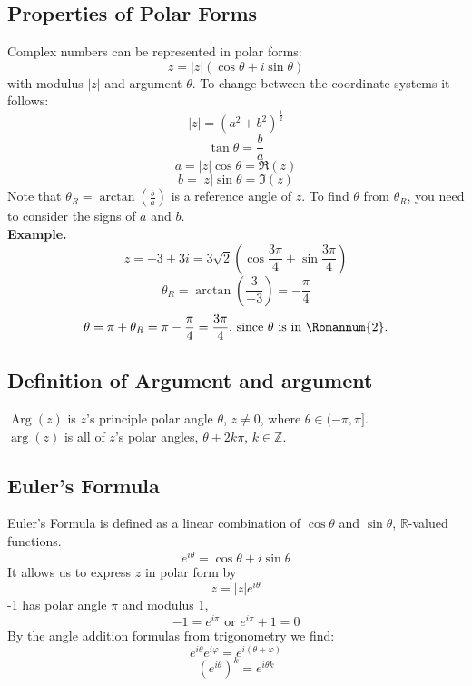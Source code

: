 \documentclass[11pt]{article}
\begin{document}
\subsection{Properties of Polar Forms} 
Complex numbers can be represented in polar forms: 
$$z = |z|(\cos\theta + i\sin\theta)$$
with modulus $|z|$ and argument $\theta$. To change between the coordinate systems it follows: 
$$|z| = (a^2 + b^2)^{\frac{1}{2}}$$
$$\tan\theta = \frac{b}{a}$$
$$a = |z|\cos\theta= \Re(z)$$
$$b = |z|\sin\theta = \Im(z)$$
Note that $\theta_R = \arctan(\frac{b}{a})$ is a reference angle of $z$. To find $\theta$ from $\theta_R$, you need to consider the signs of $a$ and $b$. \\
\newline
\textbf{Example.} \\
$$z = -3 + 3i = 3\sqrt2(\cos\frac{3\pi}{4} + \sin\frac{3\pi}{4})$$
$$\theta_R = \arctan(\frac{3}{-3})= -\frac{\pi}{4}$$
\begin{equation*}
\theta = \pi + \theta_R = \pi -\frac{\pi}{4} = \frac{3\pi}{4} \mbox{, since } \theta \mbox{ is in } \Romannum{2} .
\end{equation*}
\subsection{Definition of Argument and argument}
$\operatorname{Arg}(z)$ is $z$'s principle polar angle $\theta$, $z \neq 0$, where $\theta \in (-\pi, \pi]$. \\
$\operatorname{arg}(z)$ is all of $z$'s polar angles, $\theta + 2k\pi$, $k \in \mathbb{Z}$. 

\subsection{Euler's Formula} 
Euler's Formula is defined as a linear combination of $\cos\theta$ and $\sin\theta$, $\mathbb{R}$-valued functions. 
$$ e^{i\theta}= \cos\theta + i\sin\theta $$
It allows us to express $z$ in polar form by 
$$ z = |z|e^{i\theta}$$
-1 has polar angle $\pi$ and modulus 1, 
\begin{equation*}
-1 = e^{i\pi} \mbox{ or } e^{i\pi} + 1 = 0
\end{equation*}
By the angle addition formulas from trigonometry we find: 
$$e^{i\theta}e^{i\varphi} = e^{i(\theta + \varphi)}$$
$$(e^{i\theta})^k = e^{i\theta k}$$
\end{document}
